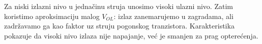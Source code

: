 Za niski izlazni nivo u jednačinu struja unosimo visoki ulazni nivo. Zatim koristimo aproksimaciju malog $V_{OL}$: izlaz zanemarujemo u zagradama, ali zadržavamo ga kao faktor uz struju pogonskog tranzistora. Karakteristika pokazuje da visoki nivo izlaza nije napajanje, već je smanjen za prag opterećenja.
